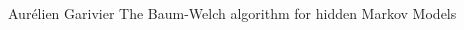 \documentclass{article}
\begin{document}
\begin{multicols}{2}

\begin{thebibliography}{9}
        Aurélien Garivier
        \newblock The Baum-Welch algorithm for hidden Markov Models
\end{thebibliography}

\end{multicols}
\end{document}
